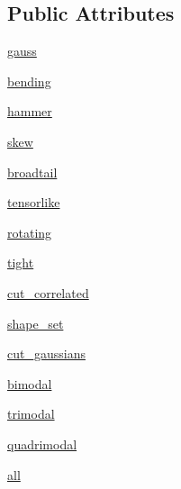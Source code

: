 \subsection*{Public Attributes}
\begin{DoxyCompactItemize}
\item 
\mbox{\hyperlink{classgetdist__tests_1_1test__distributions_1_1Test2DDistributions_a748688e9850d80905f16d657ac75ad91}{gauss}}
\item 
\mbox{\hyperlink{classgetdist__tests_1_1test__distributions_1_1Test2DDistributions_aeb1765247d92dba2ed174ab259c16996}{bending}}
\item 
\mbox{\hyperlink{classgetdist__tests_1_1test__distributions_1_1Test2DDistributions_a9e4112fbe40fc5b273f833d17e45f3f6}{hammer}}
\item 
\mbox{\hyperlink{classgetdist__tests_1_1test__distributions_1_1Test2DDistributions_aa0f644d8201f096620327ebb50edbe89}{skew}}
\item 
\mbox{\hyperlink{classgetdist__tests_1_1test__distributions_1_1Test2DDistributions_aa4afd49aa549c59a60d31c8272f1d35c}{broadtail}}
\item 
\mbox{\hyperlink{classgetdist__tests_1_1test__distributions_1_1Test2DDistributions_a671e571913bd41c24cda3d8b534f9c41}{tensorlike}}
\item 
\mbox{\hyperlink{classgetdist__tests_1_1test__distributions_1_1Test2DDistributions_ab30a6b322290bb76edb3f06de20523d0}{rotating}}
\item 
\mbox{\hyperlink{classgetdist__tests_1_1test__distributions_1_1Test2DDistributions_a39ec45305ee1172fa8e2eff8cc043feb}{tight}}
\item 
\mbox{\hyperlink{classgetdist__tests_1_1test__distributions_1_1Test2DDistributions_a41b6146247c6c0e627ddc17b0747524a}{cut\+\_\+correlated}}
\item 
\mbox{\hyperlink{classgetdist__tests_1_1test__distributions_1_1Test2DDistributions_a5de03c5c4bf5b35c8cf619e4ef8355d2}{shape\+\_\+set}}
\item 
\mbox{\hyperlink{classgetdist__tests_1_1test__distributions_1_1Test2DDistributions_a55208d3fca4b99aa8ad92f0b3b4f75cd}{cut\+\_\+gaussians}}
\item 
\mbox{\hyperlink{classgetdist__tests_1_1test__distributions_1_1Test2DDistributions_a6616c9e70730d0d1a0018113adb72406}{bimodal}}
\item 
\mbox{\hyperlink{classgetdist__tests_1_1test__distributions_1_1Test2DDistributions_a736401971139be4860e61153915b7f66}{trimodal}}
\item 
\mbox{\hyperlink{classgetdist__tests_1_1test__distributions_1_1Test2DDistributions_aa442de485c5aa40cfccff9a715324c78}{quadrimodal}}
\item 
\mbox{\hyperlink{classgetdist__tests_1_1test__distributions_1_1Test2DDistributions_a2666b7041801387da002f397283225b2}{all}}
\end{DoxyCompactItemize}



